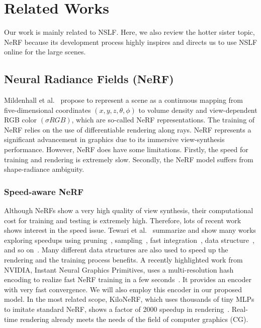 \section{Related Works}

Our work is mainly related to NSLF.
Here, we also review the hotter sister topic, NeRF because its development process highly inspires and directs us to use NSLF online for the large scenes. 

\subsection{Neural Radiance Fields (NeRF)}

Mildenhall et al.~\cite{mildenhall2020nerf} propose to represent a scene as a continuous mapping from five-dimensional coordinates $(x,y,z,\theta,\phi)$ to volume density and view-dependent RGB color $(\sigma RGB)$, which are so-called NeRF representations.
The training of NeRF relies on the use of differentiable rendering along rays.
NeRF represents a significant advancement in graphics due to its immersive view-synthesis performance.
However, NeRF does have some limitations. Firstly, the speed for training and rendering is extremely slow. Secondly, the NeRF model suffers from shape-radiance ambiguity.

\subsubsection{Speed-aware NeRF}

Although NeRFs show a very high quality of view synthesis, their computational cost for training and testing is extremely high.
Therefore, lots of recent work shows interest in the speed issue. 
%
Tewari et al.~\cite{tewari2021advances} summarize and show many works exploring speedups using pruning~\cite{liu2020neural}, sampling~\cite{neff2021donerf}, fast integration~\cite{lindell2021autoint}, data structure~\cite{yu2021plenoctrees,hedman2021baking,muller2022instant}, and so on~\cite{reiser2021kilonerf,chen2022tensorf,sitzmann2021light}.
Many different data structures are also used to speed up the rendering and the training process benefits.
A recently highlighted work from NVIDIA, Instant Neural Graphics Primitives, uses a multi-resolution hash encoding to realize fast NeRF training in a few seconds~\cite{muller2022instant}. 
It provides an encoder with very fast convergence.
We will also employ this encoder in our proposed model.  
In the most related scope, KiloNeRF, which uses thousands of tiny MLPs to imitate standard NeRF, shows a factor of 2000 speedup in rendering~\cite{reiser2021kilonerf}.
Real-time rendering already meets the needs of the field of computer graphics (CG).


